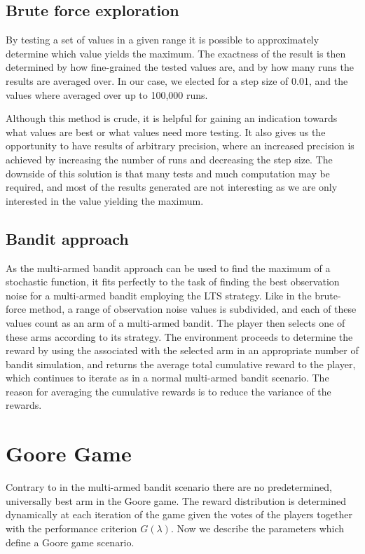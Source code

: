 \subsection{Brute force exploration}
By testing a set of values in a given range it is possible to approximately determine which value yields the maximum.
The exactness of the result is then determined by how fine-grained the tested values are, and by how many runs the results are averaged over.
In our case, we elected for a step size of 0.01, and the values where averaged over up to 100,000 runs.

Although this method is crude, it is helpful for gaining an indication towards what values are best or what values need more testing.
It also gives us the opportunity to have results of arbitrary precision, where an increased precision is achieved by increasing the number of runs and decreasing the step size.
The downside of this solution is that many tests and much computation may be required, and most of the results generated are not interesting as we are only interested in the value yielding the maximum.

\subsection{Bandit approach}
As the multi-armed bandit approach can be used to find the maximum of a stochastic function, it fits perfectly to the task of finding the best observation noise for a multi-armed bandit employing the LTS strategy.
Like in the brute-force method, a range of observation noise values is subdivided, and each of these values count as an arm of a multi-armed bandit.
The player then selects one of these arms according to its strategy.
The environment proceeds to determine the reward by using the \ob{} associated with the selected arm in an appropriate number of bandit simulation, and returns the average total cumulative reward to the player, which continues to iterate as in a normal multi-armed bandit scenario.
The reason for averaging the cumulative rewards is to reduce the variance of the rewards.

\section{Goore Game}

Contrary to in the multi-armed bandit scenario there are no predetermined, universally best arm in the Goore game.
The reward distribution is determined dynamically at each iteration of the game given the votes of the players together with the performance criterion $G(\lambda)$.
Now we describe the parameters which define a Goore game scenario.

